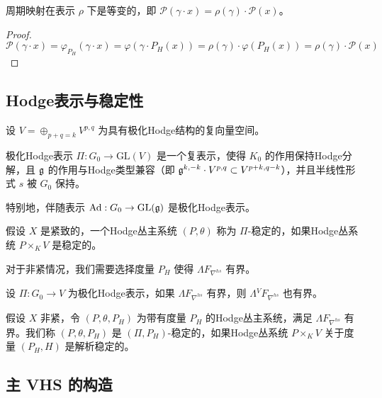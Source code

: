 \begin{proposition}\label{periodinvariant}
周期映射在表示 $\rho$ 下是等变的，即 $\mathcal{P}(\gamma \cdot x) = \rho(\gamma) \cdot \mathcal{P}(x)$。
\end{proposition}

\begin{proof}
\[ \mathcal{P}(\gamma \cdot x) = \varphi_{P_H}(\gamma \cdot x) = \varphi(\gamma \cdot P_H(x)) = \rho(\gamma) \cdot \varphi(P_H(x)) = \rho(\gamma) \cdot \mathcal{P}(x) \]
\end{proof}

\subsection{Hodge表示与稳定性}

设 $V = \oplus_{p+q=k} V^{p,q}$ 为具有极化Hodge结构的复向量空间。

\begin{definition}
极化Hodge表示 $\Pi: G_0 \to \text{GL}(V)$ 是一个复表示，使得 $K_0$ 的作用保持Hodge分解，且 $\mathfrak{g}$ 的作用与Hodge类型兼容（即 $\mathfrak{g}^{k, -k} \cdot V^{p,q} \subset V^{p+k, q-k}$），并且半线性形式 $s$ 被 $G_0$ 保持。
\end{definition}

特别地，伴随表示 $\operatorname{Ad}: G_0 \to \text{GL}(\mathfrak{g})$ 是极化Hodge表示。

\begin{definition}
假设 $X$ 是紧致的，一个Hodge丛主系统 $(P, \theta)$ 称为 $\Pi$-稳定的，如果Hodge丛系统 $P \times_K V$ 是稳定的。
\end{definition}

对于非紧情况，我们需要选择度量 $P_H$ 使得 $\Lambda F_{\nabla^{hs}}$ 有界。

\begin{lemma}
设 $\Pi: G_0 \to V$ 为极化Hodge表示，如果 $\Lambda F_{\nabla^{hs}}$ 有界，则 $\Lambda {}^V F_{\nabla^{hs}}$ 也有界。
\end{lemma}

\begin{definition}
假设 $X$ 非紧，令 $(P, \theta, P_H)$ 为带有度量 $P_H$ 的Hodge丛主系统，满足 $\Lambda F_{\nabla^{hs}}$ 有界。我们称 $(P, \theta, P_H)$ 是 $(\Pi, P_H)$-稳定的，如果Hodge丛系统 $P \times_K V$ 关于度量 $(P_H, H)$ 是解析稳定的。
\end{definition}

\subsection{主 VHS 的构造}

